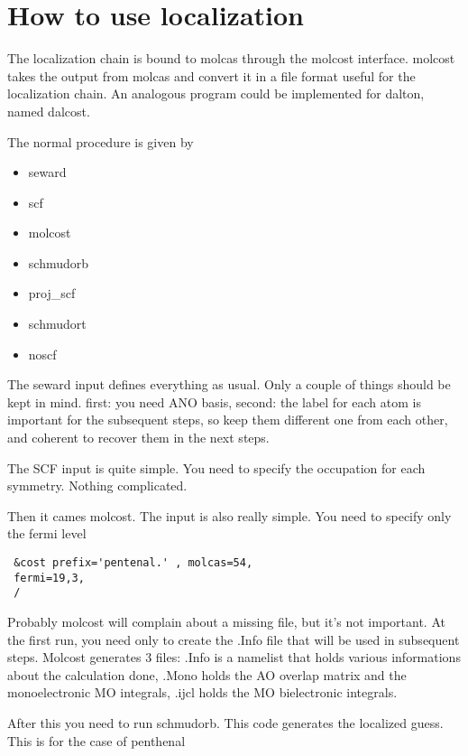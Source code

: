 \documentclass[11pt,a4paper]{article}
\begin{document}
\section{How to use localization}

The localization chain is bound to molcas through the molcost interface.
molcost takes the output from molcas and convert it in a file format useful for
the localization chain. An analogous program could be implemented for
dalton, named dalcost.

The normal procedure is given by

\begin{itemize}
\item seward 
\item scf
\item molcost
\item schmudorb
\item proj\_scf
\item schmudort
\item noscf
\end{itemize}

The seward input defines everything as usual. Only a couple of things should be
kept in mind. first: you need ANO basis, second: the label for each atom is
important for the subsequent steps, so keep them different one from each other,
and coherent to recover them in the next steps.

The SCF input is quite simple. You need to specify the occupation for each
symmetry. Nothing complicated.

Then it cames molcost. The input is also really simple. You need to specify
only the fermi level

\begin{verbatim}
 &cost prefix='pentenal.' , molcas=54,
 fermi=19,3,
 /
\end{verbatim}

Probably molcost will complain about a missing file, but it's not
important. At the first run, you need only to create the .Info file that
will be used in subsequent steps. Molcost generates 3 files: .Info is a
namelist that holds various informations about the calculation done, .Mono
holds the AO overlap matrix and the monoelectronic MO integrals, .ijcl holds
the MO bielectronic integrals.

After this you need to run schmudorb. This code generates the localized guess.
This is for the case of penthenal
\end{document}
